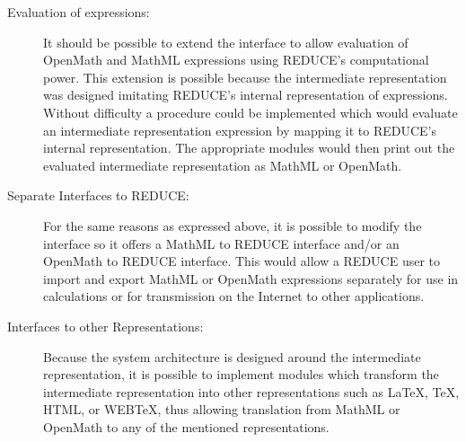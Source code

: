 \begin{description}

\item[Evaluation of expressions:] It should be possible to extend the interface to allow evaluation of OpenMath and MathML expressions using
REDUCE's computational power. This extension is possible because the intermediate representation was designed imitating REDUCE's internal
representation of expressions. Without difficulty a procedure could be implemented which would evaluate an intermediate representation expression
by mapping it to REDUCE's internal representation. The appropriate modules would then print out the evaluated intermediate representation as MathML
or OpenMath.

\item[Separate Interfaces to REDUCE:] For the same reasons as expressed above, it is possible to modify the interface so it offers a MathML to
REDUCE interface and/or an OpenMath to REDUCE interface. This would allow a REDUCE user to import and export MathML or OpenMath expressions
separately for use in calculations or for transmission on the Internet to other applications.

\item[Interfaces to other Representations:] Because the system architecture is designed around the intermediate representation, it is possible to
implement modules which transform the intermediate representation into other representations such as \LaTeX, \TeX, HTML, or WEB\TeX, thus allowing
translation from MathML or OpenMath to any of the mentioned representations.

\end{description}


